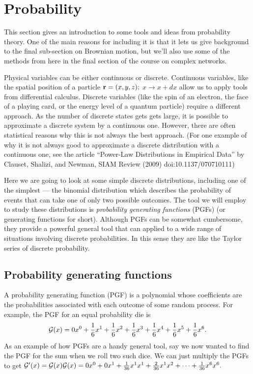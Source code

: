 \section{Probability}
This section gives an introduction to some tools and ideas from probability theory. One of the main reasons for including it is that it lets us give background to the final sub-section on Brownian motion, but we'll also use some of the methods from here in the final section of the course on complex networks.

Physical variables can be either continuous or discrete. Continuous variables, like the spatial position of a particle ${\bf r} = (x,y,z);$ $x\rightarrow x+dx$ allow us to apply tools from differential calculus. Discrete variables (like the spin of an electron, the face of a playing card, or the energy level of a quantum particle) require a different approach. As the number of discrete states gets gets large, it is possible to approximate a discrete system by a continuous one. However, there are often statistical reasons why this is not always the best approach. (For one example of why it is not always good to approximate a discrete distribution with a continuous one, see the article ``Power-Law Distributions in Empirical Data'' by Clauset, Shalizi, and Newman, SIAM Review (2009) doi:10.1137/070710111) 

Here we are going to look at some simple discrete distributions, including one of the simplest --- the binomial distribution which describes the probability of events that can take one of only two possible outcomes. The tool we will employ to study these distributions is \emph{probability generating functions} (PGFs) (or generating functions for short). Although PGFs can be somewhat cumbersome, they provide a powerful general tool that can applied to a wide range of situations involving discrete probabilities. In this sense they are like the Taylor series of discrete probability.

\subsection{Probability generating functions}
A probability generating function (PGF) is a polynomial whose coefficients are the probabilities associated with each outcome of some random process.
For example, the PGF for an equal probability die is 
$$\mathcal{G}(x) = 0x^0+\frac16x^1+\frac16x^2+\frac16x^3+\frac16x^4+\frac16x^5+\frac16x^6.$$
As an example of how PGFs are a handy general tool, say we now wanted to find the PGF for the sum when we roll two such dice. We can just multiply the PGFs to get $\mathcal{G}'(x) = \mathcal{G}(x)\mathcal{G}(x) = 0x^0 + 0x^1+\frac{1}{36}x^1x^1+\frac{2}{36}x^1x^2+\cdots+\frac{1}{36}x^6x^6.$


